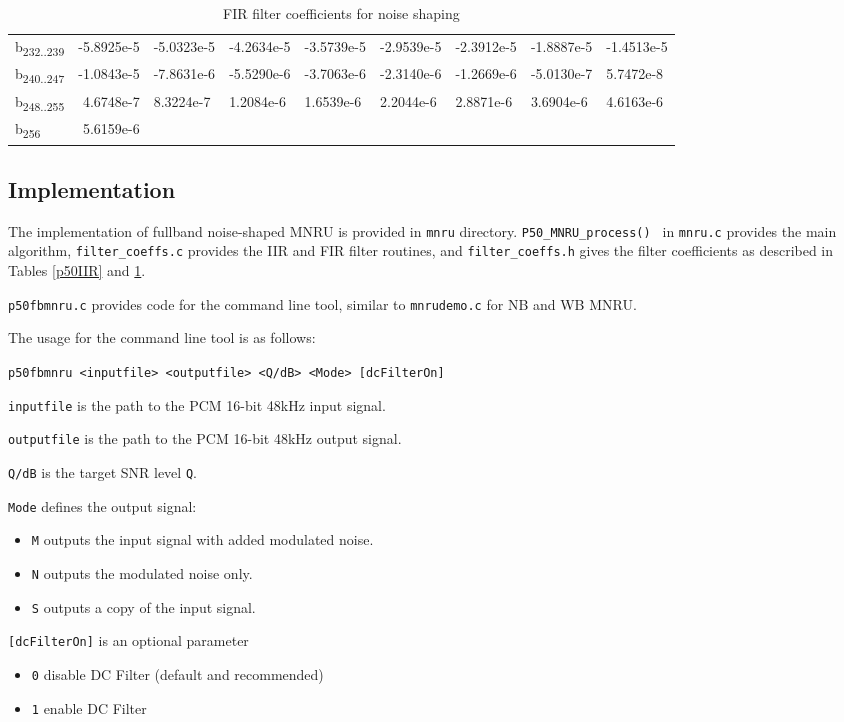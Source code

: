 \begin{table}
{\begin{tabular}{lrlllllll}
        b\textsubscript{232..239} & -5.8925e-5 & -5.0323e-5 & -4.2634e-5 & -3.5739e-5 & -2.9539e-5 & -2.3912e-5 & -1.8887e-5 & -1.4513e-5 \\
        b\textsubscript{240..247} & -1.0843e-5 & -7.8631e-6 & -5.5290e-6 & -3.7063e-6 & -2.3140e-6 & -1.2669e-6 & -5.0130e-7 & 5.7472e-8 \\
        b\textsubscript{248..255} & 4.6748e-7 & 8.3224e-7 & 1.2084e-6 & 1.6539e-6 & 2.2044e-6 & 2.8871e-6 & 3.6904e-6 & 4.6163e-6 \\
        b\textsubscript{256} & 5.6159e-6 &  &  &  &  &  &  &  \\
    \end{tabular}}
    \caption{FIR filter coefficients for noise shaping}
    \label{p50FIR}
\end{table}

\subsection {Implementation}

The implementation of fullband noise-shaped MNRU is provided in {\tt mnru} directory.
{\tt P50\_MNRU\_process() } in {\tt mnru.c} provides the main algorithm,
{\tt filter\_coeffs.c} provides the IIR and FIR filter routines,
and {\tt filter\_coeffs.h} gives the filter coefficients as described in Tables \ref{p50IIR} and \ref{p50FIR}.

{\tt p50fbmnru.c} provides code for the command line tool, similar to {\tt mnrudemo.c} for NB and WB MNRU.

The usage for the command line tool is as follows:

{\tt p50fbmnru <inputfile> <outputfile> <Q/dB> <Mode> [dcFilterOn]}

{\tt inputfile} is the path to the PCM 16-bit 48kHz input signal.

{\tt outputfile} is the path to the PCM 16-bit 48kHz output signal.

{\tt Q/dB} is the target SNR level {\tt Q}.

{\tt Mode} defines the output signal:
\begin{itemize}
    \item {\tt M} outputs the input signal with added modulated noise.
    \item {\tt N} outputs the modulated noise only.
    \item {\tt S} outputs a copy of the input signal.
\end{itemize}

{\tt [dcFilterOn]} is an optional parameter
\begin{itemize}
    \item {\tt 0} disable DC Filter (default and recommended)
    \item {\tt 1} enable DC Filter
\end{itemize}


